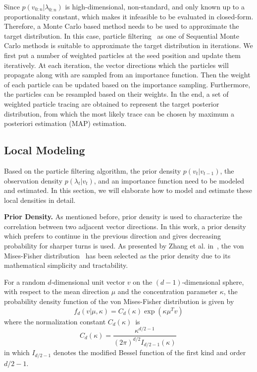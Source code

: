 Since $p({v_{0:n}}|{\lambda_{0:n}})$ is high-dimensional, non-standard, and only known up to a proportionality constant, which makes it infeasible to be evaluated in closed-form. Therefore, a Monte Carlo based method needs to be used to approximate the target distribution. In this case, particle filtering~\cite{doucet2001sequential} as one of Sequential Monte Carlo methods is suitable to approximate the target distribution in iterations. We first put a number of weighted particles at the seed position and update them iteratively. At each iteration, the vector directions which the particles will propagate along with are sampled from an importance function. Then the weight of each particle can be updated based on the importance sampling. Furthermore, the particles can be resampled based on their weights. In the end, a set of weighted particle tracing are obtained to represent the target posterior distribution, from which the most likely trace can be chosen by maximum a posteriori estimation (MAP) estimation.

\subsection{Local Modeling}

Based on the particle filtering algorithm, the prior density $p({v_t}|{v_{t - 1}})$, the observation density $p({\lambda_t}|{v_t})$, and an importance function need to be modeled and estimated. In this section, we will elaborate how to model and estimate these local densities in detail.

\noindent\textbf{Prior Density.} As mentioned before, prior density is used to characterize the correlation between two adjacent vector directions. In this work, a prior density which prefers to continue in the previous direction and gives decreasing probability for sharper turns is used. As presented by Zhang et al. in~\cite{Zhang20095}, the von Mises-Fisher distribution~\cite{fisher} has been selected as the prior density due to its mathematical simplicity and tractability.

For a random $d$-dimensional unit vector $v$ on the $(d-1)$-dimensional sphere, with respect to the mean direction $\mu$ and the concentration parameter $\kappa$, the probability density function of the von Mises-Fisher distribution is given by
\begin{equation}
  f_{d}(v| \mu, \kappa)=C_{d}(\kappa)\exp \left( {\kappa \mu^T v } \right)
\end{equation}
where the normalization constant $C_{d}(\kappa)\,$ is
\begin{equation}
  C_{d}(\kappa)=\frac {\kappa^{d/2-1}} {(2\pi)^{d/2}I_{d/2-1}(\kappa)} \,
\end{equation}
in which $I_{d/2-1}$ denotes the modified Bessel function of the first kind and order $d/2-1$.

